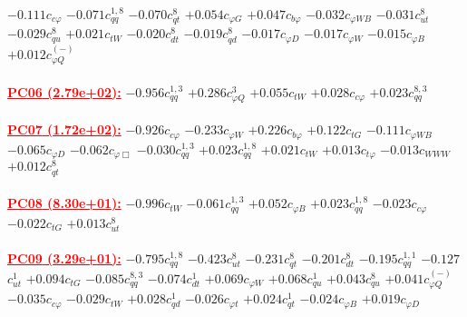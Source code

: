 \documentclass{article}
\begin{document}
{$-0.111$}{\rm $c_{c \varphi}$}
{$-0.071$}{\rm $c_{qq}^{1,8}$}
{$-0.070$}{\rm $c_{qt}^{8}$}
{$+0.054$}{\rm $c_{\varphi G}$}
{$+0.047$}{\rm $c_{b \varphi}$}
{$-0.032$}{\rm $c_{\varphi WB}$}
{$-0.031$}{\rm $c_{ut}^{8}$}
{$-0.029$}{\rm $c_{qu}^{8}$}
{$+0.021$}{\rm $c_{tW}$}
{$-0.020$}{\rm $c_{dt}^{8}$}
{$-0.019$}{\rm $c_{qd}^{8}$}
{$-0.017$}{\rm $c_{\varphi D}$}
{$-0.017$}{\rm $c_{\varphi W}$}
{$-0.015$}{\rm $c_{\varphi B}$}
{$+0.012$}{\rm $c_{\varphi Q}^{(-)}$}
 \nonumber \\ \nonumber \\
\noindent \textcolor{red}{\underline{\bf{PC06} (2.79e+02):}}
{$-0.956$}{\rm $c_{qq}^{1,3}$}
{$+0.286$}{\rm $c_{\varphi Q}^{3}$}
{$+0.055$}{\rm $c_{tW}$}
{$+0.028$}{\rm $c_{c \varphi}$}
{$+0.023$}{\rm $c_{qq}^{8,3}$}
 \nonumber \\ \nonumber \\
\noindent \textcolor{red}{\underline{\bf{PC07} (1.72e+02):}}
{$-0.926$}{\rm $c_{c \varphi}$}
{$-0.233$}{\rm $c_{\varphi W}$}
{$+0.226$}{\rm $c_{b \varphi}$}
{$+0.122$}{\rm $c_{tG}$}
{$-0.111$}{\rm $c_{\varphi WB}$}
{$-0.065$}{\rm $c_{\varphi D}$}
{$-0.062$}{\rm $c_{\varphi \Box}$}
{$-0.030$}{\rm $c_{qq}^{1,3}$}
{$+0.023$}{\rm $c_{qq}^{1,8}$}
{$+0.021$}{\rm $c_{tW}$}
{$+0.013$}{\rm $c_{t \varphi}$}
{$-0.013$}{\rm $c_{WWW}$}
{$+0.012$}{\rm $c_{qt}^{8}$}
 \nonumber \\ \nonumber \\
\noindent \textcolor{red}{\underline{\bf{PC08} (8.30e+01):}}
{$-0.996$}{\rm $c_{tW}$}
{$-0.061$}{\rm $c_{qq}^{1,3}$}
{$+0.052$}{\rm $c_{\varphi B}$}
{$+0.023$}{\rm $c_{qq}^{1,8}$}
{$-0.023$}{\rm $c_{c \varphi}$}
{$-0.022$}{\rm $c_{tG}$}
{$+0.013$}{\rm $c_{ut}^{8}$}
 \nonumber \\ \nonumber \\
\noindent \textcolor{red}{\underline{\bf{PC09} (3.29e+01):}}
{$-0.795$}{\rm $c_{qq}^{1,8}$}
{$-0.423$}{\rm $c_{ut}^{8}$}
{$-0.231$}{\rm $c_{qt}^{8}$}
{$-0.201$}{\rm $c_{dt}^{8}$}
{$-0.195$}{\rm $c_{qq}^{1,1}$}
{$-0.127$}{\rm $c_{ut}^{1}$}
{$+0.094$}{\rm $c_{tG}$}
{$-0.085$}{\rm $c_{qq}^{8,3}$}
{$-0.074$}{\rm $c_{dt}^{1}$}
{$+0.069$}{\rm $c_{\varphi W}$}
{$+0.068$}{\rm $c_{qu}^{1}$}
{$+0.043$}{\rm $c_{qu}^{8}$}
{$+0.041$}{\rm $c_{\varphi Q}^{(-)}$}
{$-0.035$}{\rm $c_{c \varphi}$}
{$-0.029$}{\rm $c_{tW}$}
{$+0.028$}{\rm $c_{qd}^{1}$}
{$-0.026$}{\rm $c_{\varphi t}$}
{$+0.024$}{\rm $c_{qt}^{1}$}
{$-0.024$}{\rm $c_{\varphi B}$}
{$+0.019$}{\rm $c_{\varphi D}$}
 \nonumber \\ \nonumber \\
\end{document}
